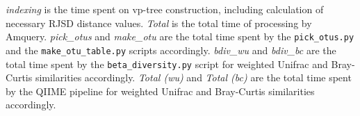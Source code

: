 \documentclass[10pt,letterpaper]{article}
\begin{document}
\begin{table}[!ht]
\begin{adjustwidth}{-2.25in}{0in}
\begin{flushleft}
\textit{indexing} is the time spent on vp-tree construction, including calculation of necessary RJSD distance values.
\textit{Total} is the total time of processing by Amquery.
\textit{pick\_otus} and \textit{make\_otu} are the total time spent by the \texttt{pick\_otus.py} and the \texttt{make\_otu\_table.py} scripts accordingly.
\textit{bdiv\_wu} and \textit{bdiv\_bc} are the total time spent by the \texttt{beta\_diversity.py} script for weighted Unifrac and Bray-Curtis similarities accordingly.
\textit{Total (wu)} and \textit{Total (bc)} are the total time spent by the QIIME pipeline for weighted Unifrac and Bray-Curtis similarities accordingly.
\end{flushleft}
\label{table1}
\end{adjustwidth}
\end{table}
\end{document}

